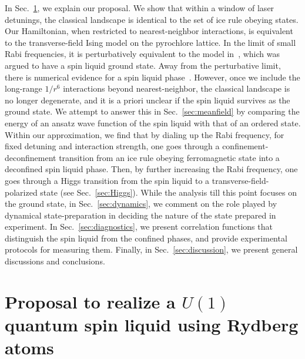 \documentclass[twocolumn,superscriptaddress,amsmath,amssymb,aps,prx,nofootinbib]{revtex4-2}
\begin{document}
In Sec.~\ref{sec:proposal}, we explain our proposal. We show that within a window of laser detunings, the classical landscape is identical to the set of ice rule obeying states. Our Hamiltonian, when restricted to nearest-neighbor interactions, is equivalent to the transverse-field Ising model on the pyrochlore lattice. In the limit of small Rabi frequencies, it is perturbatively equivalent to the model in~\cite{hermele2004}, which was argued to have a spin liquid ground state. Away from the perturbative limit, there is numerical evidence for a spin liquid phase~\cite{emonts2018monte}. However, once we include the long-range $1/r^6$ interactions beyond nearest-neighbor, the classical landscape is no longer degenerate, and it is a priori unclear if the spin liquid survives as the ground state. We attempt to answer this in Sec.~\ref{sec:meanfield} by comparing the energy of an ansatz wave function of the spin liquid with that of an ordered state. 
Within our approximation, we find that by dialing up the Rabi frequency, for fixed detuning and interaction strength, one goes through a confinement-deconfinement transition from an ice rule obeying ferromagnetic state into a deconfined spin liquid phase. Then, by further increasing the Rabi frequency, one goes through a Higgs transition from the spin liquid to a transverse-field-polarized state (see Sec.~\ref{sec:Higgs}). 
While the analysis till this point focuses on the ground state, in Sec.~\ref{sec:dynamics}, we comment on the role played by dynamical state-preparation in deciding the nature of the state prepared in experiment. In Sec.~\ref{sec:diagnostics}, we present correlation functions that distinguish the spin liquid from the confined phases, and provide experimental protocols for measuring them.
Finally, in Sec.~\ref{sec:discussion}, we present general discussions and conclusions.


\section{Proposal to realize a $U(1)$ quantum spin liquid using Rydberg atoms}\label{sec:proposal}
\end{document}
